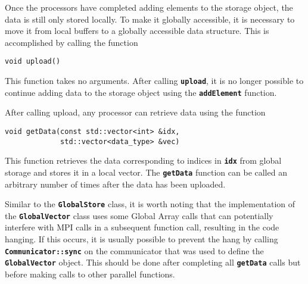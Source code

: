 Once the processors have completed adding elements to the storage object, the data is still only stored locally. To make it globally accessible, it is necessary to move it from local buffers to a globally accessible data structure. This is accomplished by calling the function

{
\color{red}
\begin{Verbatim}[fontseries=b]
void upload()
\end{Verbatim}
}

This function takes no arguments. After calling \texttt{\textbf{upload}}, it is
no longer possible to continue adding data to the storage object using the
\texttt{\textbf{addElement}} function.

After calling upload, any processor can retrieve data using the function

{
\color{red}
\begin{Verbatim}[fontseries=b]
void getData(const std::vector<int> &idx,
             std::vector<data_type> &vec)
\end{Verbatim}
}

This function retrieves the data corresponding to indices in
\texttt{\textbf{idx}} from global storage and stores it in a local vector. The
\texttt{\textbf{getData}} function can be called an arbitrary number of times after the data has been uploaded.

Similar to the \texttt{\textbf{GlobalStore}} class, it is worth noting that
the implementation of the \texttt{\textbf{GlobalVector}} class uses some Global
Array calls that can potentially interfere with MPI calls in a subsequent
function call, resulting in the code hanging. If this occurs, it is usually
possible to prevent the hang by calling \texttt{\textbf{Communicator::sync}} on
the communicator that was used to define the \texttt{\textbf{GlobalVector}}
object. This should be done after completing all \texttt{\textbf{getData}} calls
but before making calls to other parallel functions.
